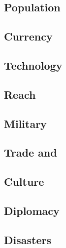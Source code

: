 \documentclass[12pt,a4paper,twocolumn,titlepage]{article}
\begin{document}
\subsection{Population}
\label{sec:population}

% 

\subsection{Currency}
\label{sec:currency}


\subsection{Technology}
\label{sec:technology}


\subsection{Reach}
\label{sec:reach}


\subsection{Military}
\label{sec:military}

% 

\subsection{Trade and \convoys}
\label{sec:trade}


\subsection{Culture}
\label{sec:culture}


\subsection{Diplomacy}
\label{sec:diplomacy}


\subsection{Disasters}
\label{sec:disasters}

\end{document}
